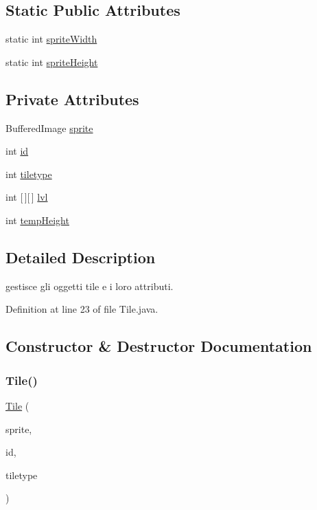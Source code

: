 \subsection*{Static Public Attributes}
\begin{DoxyCompactItemize}
\item 
static int \hyperlink{classobjects_1_1_tile_afbef0b8f1824dfedcb984b1547cc0dde}{sprite\+Width}
\item 
static int \hyperlink{classobjects_1_1_tile_af57e825c5781fcdc5e47e2eb5e553c4c}{sprite\+Height}
\end{DoxyCompactItemize}
\subsection*{Private Attributes}
\begin{DoxyCompactItemize}
\item 
Buffered\+Image \hyperlink{classobjects_1_1_tile_a596d0c3eea54a08f78cbad0a4fbec565}{sprite}
\item 
int \hyperlink{classobjects_1_1_tile_a7441ef0865bcb3db9b8064dd7375c1ea}{id}
\item 
int \hyperlink{classobjects_1_1_tile_aa7bcd46686997f7cbef377c22eed1c8d}{tiletype}
\item 
int \mbox{[}$\,$\mbox{]}\mbox{[}$\,$\mbox{]} \hyperlink{classobjects_1_1_tile_a4b06a2210cf5b93dda77f2a9a061d538}{lvl}
\item 
int \hyperlink{classobjects_1_1_tile_a6cb3d99320ebf80da884900b159d240e}{temp\+Height}
\end{DoxyCompactItemize}


\subsection{Detailed Description}
gestisce gli oggetti tile e i loro attributi. 

Definition at line 23 of file Tile.\+java.



\subsection{Constructor \& Destructor Documentation}
\mbox{\label{classobjects_1_1_tile_acbf8ab43b0cee998ab5f07f76d55fdee}} 
\subsubsection{\texorpdfstring{Tile()}{Tile()}}
{\footnotesize\ttfamily \hyperlink{classobjects_1_1_tile}{Tile} (\begin{DoxyParamCaption}\item[{Buffered\+Image}]{sprite,  }\item[{int}]{id,  }\item[{int}]{tiletype }\end{DoxyParamCaption})}




